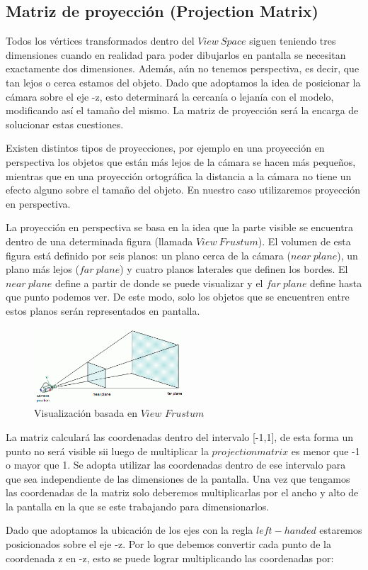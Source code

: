 \documentclass[a4paper]{article}
\begin{document}
\subsection{Matriz de proyección (Projection Matrix)} \label{projection}
Todos los vértices transformados dentro del $View \ Space$ siguen teniendo tres dimensiones cuando en realidad para poder dibujarlos en pantalla se necesitan exactamente dos dimensiones. Además, aún no tenemos perspectiva, es decir, que tan lejos o cerca estamos del objeto. Dado que adoptamos la idea de posicionar la cámara sobre el eje -z, esto determinará la cercanía o lejanía con el modelo, modificando así el tamaño del mismo. La matriz de proyección será la encarga de solucionar estas cuestiones.
\par Existen distintos tipos de proyecciones, por ejemplo en una proyección en perspectiva los objetos que están más lejos de la cámara se hacen más pequeños, mientras que en una proyección ortográfica la distancia a la cámara no tiene un efecto alguno sobre el tamaño del objeto. En nuestro caso utilizaremos proyección en perspectiva.
\par La proyección en perspectiva se basa en la idea que la parte visible se encuentra dentro de una determinada figura (llamada $View \ Frustum$). El volumen de esta figura está definido por seis planos: un plano cerca de la cámara ($near \ plane$), un plano más lejos ($far \ plane$) y cuatro planos laterales que definen los bordes. El $near \ plane$  define a partir de donde se puede visualizar y el $far \ plane$ define hasta que punto podemos ver. De este modo, solo los objetos que se encuentren entre estos planos serán representados en pantalla. 
 
 
\begin{figure}[h]
    \centering
    \includegraphics[width=0.50\textwidth]{Imagenes/b.png}
    \caption{Visualización basada en $View $ $Frustum$}
    \label{fig:mesh1}
\end{figure}
La matriz calculará las coordenadas dentro del intervalo [-1,1], de esta forma un punto no será visible sii luego de multiplicar la $projection matrix$ es menor que -1 o mayor que 1. Se adopta utilizar las coordenadas dentro de ese intervalo para que sea independiente de las dimensiones de la pantalla. Una vez que tengamos las coordenadas de la matriz solo deberemos multiplicarlas por el ancho y alto de la pantalla en la que se este trabajando para dimensionarlos.
\par Dado que adoptamos la ubicación de los ejes con la regla $left-handed$ estaremos posicionados sobre el eje -z. Por lo que debemos convertir cada punto de la coordenada z en -z, esto se puede lograr multiplicando las coordenadas por: 
\end{document}
